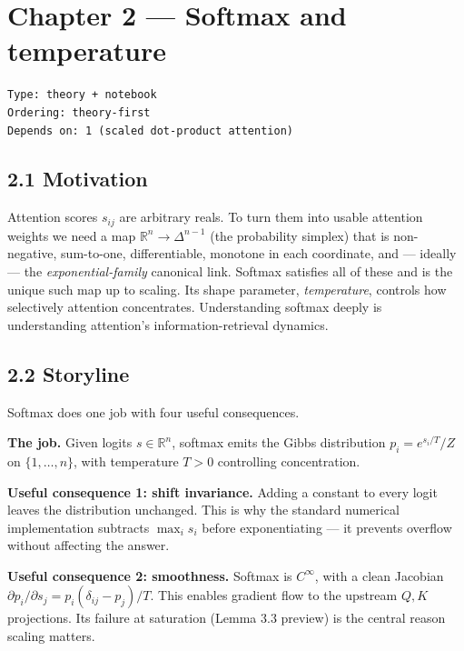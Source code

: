 \documentclass[
]{article}
\author{}
\date{}
\begin{document}
\hypertarget{chapter-2-softmax-and-temperature}{%
\section{Chapter 2 --- Softmax and
temperature}\label{chapter-2-softmax-and-temperature}}

\begin{verbatim}
Type: theory + notebook
Ordering: theory-first
Depends on: 1 (scaled dot-product attention)
\end{verbatim}

\hypertarget{motivation}{%
\subsection{2.1 Motivation}\label{motivation}}

Attention scores \(s_{ij}\) are arbitrary reals. To turn them into
usable attention weights we need a map \(\mathbb{R}^n \to \Delta^{n-1}\)
(the probability simplex) that is non-negative, sum-to-one,
differentiable, monotone in each coordinate, and --- ideally --- the
\emph{exponential-family} canonical link. Softmax satisfies all of these
and is the unique such map up to scaling. Its shape parameter,
\emph{temperature}, controls how selectively attention concentrates.
Understanding softmax deeply is understanding attention's
information-retrieval dynamics.

\hypertarget{storyline}{%
\subsection{2.2 Storyline}\label{storyline}}

Softmax does one job with four useful consequences.

\textbf{The job.} Given logits \(s \in \mathbb{R}^n\), softmax emits the
Gibbs distribution \(p_i = e^{s_i/T} / Z\) on \(\{1, \dots, n\}\), with
temperature \(T > 0\) controlling concentration.

\textbf{Useful consequence 1: shift invariance.} Adding a constant to
every logit leaves the distribution unchanged. This is why the standard
numerical implementation subtracts \(\max_i s_i\) before exponentiating
--- it prevents overflow without affecting the answer.

\textbf{Useful consequence 2: smoothness.} Softmax is \(C^\infty\), with
a clean Jacobian
\(\partial p_i / \partial s_j = p_i(\delta_{ij} - p_j) / T\). This
enables gradient flow to the upstream \(Q, K\) projections. Its failure
at saturation (Lemma 3.3 preview) is the central reason scaling matters.
\end{document}
